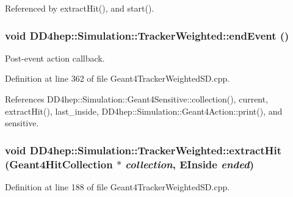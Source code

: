 Referenced by extractHit(), and start().\hypertarget{struct_d_d4hep_1_1_simulation_1_1_tracker_weighted_aa489deb875d6f5867917d2b7aae00747}{
\subsubsection[{endEvent}]{\setlength{\rightskip}{0pt plus 5cm}void DD4hep::Simulation::TrackerWeighted::endEvent ()}}
\label{struct_d_d4hep_1_1_simulation_1_1_tracker_weighted_aa489deb875d6f5867917d2b7aae00747}


Post-\/event action callback. 

Definition at line 362 of file Geant4TrackerWeightedSD.cpp.

References DD4hep::Simulation::Geant4Sensitive::collection(), current, extractHit(), last\_\-inside, DD4hep::Simulation::Geant4Action::print(), and sensitive.\hypertarget{struct_d_d4hep_1_1_simulation_1_1_tracker_weighted_a690b6f7fdcda6bbec2e7cb89f4fce9af}{
\subsubsection[{extractHit}]{\setlength{\rightskip}{0pt plus 5cm}void DD4hep::Simulation::TrackerWeighted::extractHit ({\bf Geant4HitCollection} $\ast$ {\em collection}, \/  EInside {\em ended})}}
\label{struct_d_d4hep_1_1_simulation_1_1_tracker_weighted_a690b6f7fdcda6bbec2e7cb89f4fce9af}


Definition at line 188 of file Geant4TrackerWeightedSD.cpp.


